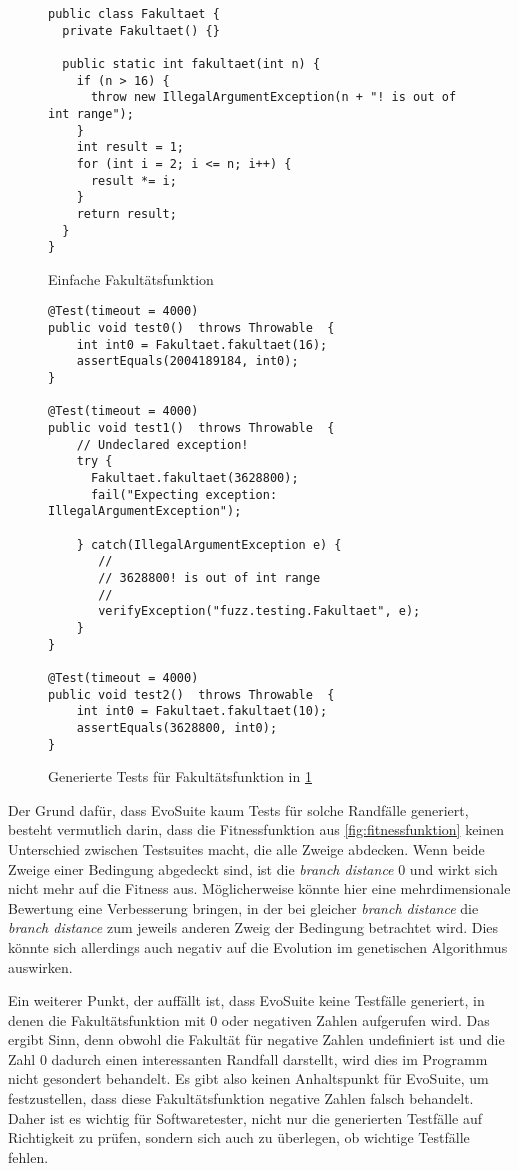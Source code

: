 \documentclass[a4paper,11pt]{article}
\begin{document}
\begin{figure}[h]
	\begin{lstlisting}[basicstyle=\ttfamily\tiny]
public class Fakultaet {
  private Fakultaet() {}

  public static int fakultaet(int n) {
    if (n > 16) {
      throw new IllegalArgumentException(n + "! is out of int range");
    }
    int result = 1;
    for (int i = 2; i <= n; i++) {
      result *= i;
    }
    return result;
  }
}
	\end{lstlisting}
	\caption{Einfache Fakultätsfunktion}
	\label{fig:fakultaet}
\end{figure}

\begin{figure}[h]
	\begin{lstlisting}[basicstyle=\ttfamily\tiny]
@Test(timeout = 4000)
public void test0()  throws Throwable  {
    int int0 = Fakultaet.fakultaet(16);
    assertEquals(2004189184, int0);
}

@Test(timeout = 4000)
public void test1()  throws Throwable  {
    // Undeclared exception!
    try { 
      Fakultaet.fakultaet(3628800);
      fail("Expecting exception: IllegalArgumentException");
    
    } catch(IllegalArgumentException e) {
       //
       // 3628800! is out of int range
       //
       verifyException("fuzz.testing.Fakultaet", e);
    }
}

@Test(timeout = 4000)
public void test2()  throws Throwable  {
    int int0 = Fakultaet.fakultaet(10);
    assertEquals(3628800, int0);
}
	\end{lstlisting}
	\caption{Generierte Tests für Fakultätsfunktion in \cref{fig:fakultaet}}
	\label{fig:fakultaet_tests}
\end{figure}

Der Grund dafür, dass EvoSuite kaum Tests für solche Randfälle generiert, besteht vermutlich darin, dass die Fitnessfunktion aus \cref{fig:fitnessfunktion} keinen Unterschied zwischen Testsuites macht, die alle Zweige abdecken.
Wenn beide Zweige einer Bedingung abgedeckt sind, ist die \textit{branch distance} 0 und wirkt sich nicht mehr auf die Fitness aus.
Möglicherweise könnte hier eine mehrdimensionale Bewertung eine Verbesserung bringen, in der bei gleicher \textit{branch distance} die \textit{branch distance} zum jeweils anderen Zweig der Bedingung betrachtet wird.
Dies könnte sich allerdings auch negativ auf die Evolution im genetischen Algorithmus auswirken.

Ein weiterer Punkt, der auffällt ist, dass EvoSuite keine Testfälle generiert, in denen die Fakultätsfunktion mit 0 oder negativen Zahlen aufgerufen wird.
Das ergibt Sinn, denn obwohl die Fakultät für negative Zahlen undefiniert ist und die Zahl 0 dadurch einen interessanten Randfall darstellt, wird dies im Programm nicht gesondert behandelt.
Es gibt also keinen Anhaltspunkt für EvoSuite, um festzustellen, dass diese Fakultätsfunktion negative Zahlen falsch behandelt.
Daher ist es wichtig für Softwaretester, nicht nur die generierten Testfälle auf Richtigkeit zu prüfen, sondern sich auch zu überlegen, ob wichtige Testfälle fehlen.
\end{document}
